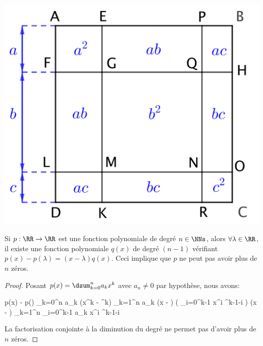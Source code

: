 \begin{center}
	\includegraphics[scale = .7]{(a+b+c)^2.png}
\end{center}




\begin{preli} \label{poly-finite-zeros}
	Si $p: \RR \rightarrow \RR$ est une fonction polynomiale de degré $n \in \NNs$,
	alors $\forall \lambda \in \RR$,
	il existe une fonction polynomiale $q(x)$ de degré $(n-1)$ vérifiant
	$p(x) - p(\lambda) = (x - \lambda) q(x)$.
	Ceci implique que $p$ ne peut pas avoir plus de $n$ zéros.
\end{preli}


\newpage
\begin{proof}
	Posant $p(x) = \dsum_{k=0}^{n} a_k x^k$ avec $a_n \neq 0$ par hypothèse, nous avons:
	
	\begin{stepcalc}[style=sar]
	    p(x) - p(\lambda)
	\explnext{}
	    \dsum_{k=0}^{n} a_k (x^k - \lambda^k)
	\explnext{}
	    \dsum_{k=1}^{n} a_k (x - \lambda) \big( \dsum_{i=0}^{k-1} x^i \lambda^{k-1-i} \big)
	\explnext{}
	    (x - \lambda) \dsum_{k=1}^{n} \dsum_{i=0}^{k-1} a_k x^i \lambda^{k-1-i} 
	\end{stepcalc}
	
	La factorisation conjointe à la diminution du degré ne permet pas d'avoir plus de $n$ zéros. 
\end{proof}




